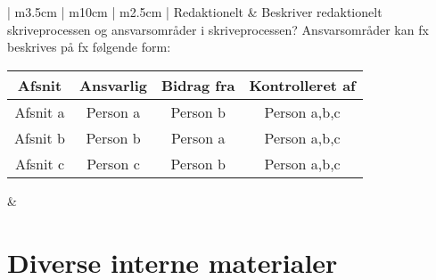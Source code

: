 \begin{center}
\begin{longtable}{| m{3.5cm} | m{10cm} | m{2.5cm} |}
\hline
Redaktionelt & Beskriver redaktionelt skriveprocessen og ansvarsområder i skriveprocessen?\newline
Ansvarsområder kan fx beskrives på fx følgende form: \begin{tabular}{|c|c|c|c|}
\hline Afsnit & Ansvarlig & Bidrag fra & Kontrolleret af \\ \hline
Afsnit a & Person a & Person b & Person a,b,c \\ \hline
Afsnit b & Person b & Person a & Person a,b,c \\ \hline
Afsnit c & Person c & Person b & Person a,b,c \\ \hline
\end{tabular} & \\ 
\hline


\end{longtable}
\end{center}

\section{Diverse interne materialer}
\clearpage
